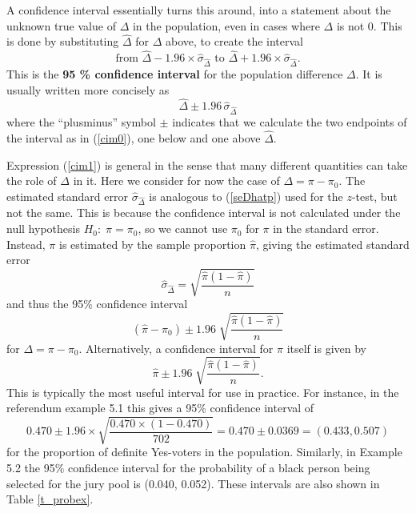 A confidence interval essentially turns this around, into a statement
about the unknown true value of $\Delta$ in the population, even in
cases where $\Delta$ is not 0.
This is done by substituting $\hat{\Delta}$ for $\Delta$
above, to create the interval
\begin{equation}
\text{from  }
\hat{\Delta} -1.96\times \hat{\sigma}_{\hat{\Delta}}
\text{  to  }
\hat{\Delta}
+1.96\times \hat{\sigma}_{\hat{\Delta}}.
\label{cim0}
\end{equation}
This is the \textbf{95 \% confidence interval} for the population
difference $\Delta$. It is
usually written more concisely as
\begin{equation}
\hat{\Delta}
\pm 1.96\, \hat{\sigma}_{\hat{\Delta}}
\label{cim1}
\end{equation}
where the ``plusminus'' symbol $\pm$ indicates that we calculate the two
endpoints of the interval as in (\ref{cim0}), one below and one above
$\hat{\Delta}$.

Expression (\ref{cim1}) is general in the sense that many different
quantities can take the role of $\Delta$ in it. Here we consider for now
the case of $\Delta=\pi-\pi_{0}$. The estimated standard error
$\hat{\sigma}_{\hat{\Delta}}$ is analogous to
(\ref{seDhatp}) used for the $z$-test, but not the same.
This is because the confidence interval
is not calculated under the null hypothesis $H_{0}:\; \pi=\pi_{0}$, so
we cannot use $\pi_{0}$ for $\pi$ in the standard error. Instead, $\pi$
is estimated by the sample proportion $\hat{\pi}$, giving the estimated
standard error
\begin{equation}
\hat{\sigma}_{\hat{\Delta}} = \sqrt{
\frac{\hat{\pi}(1-\hat{\pi})}{n}
}
\label{sephat2}
\end{equation}
and thus the 95\% confidence interval
\[
(\hat{\pi}-\pi_{0}) \pm 1.96 \;
\sqrt{
\frac{\hat{\pi}(1-\hat{\pi})}{n}}
\]
for $\Delta=\pi-\pi_{0}$. Alternatively, a confidence interval for
$\pi$ itself is given by
\begin{equation}
\hat{\pi} \pm 1.96 \;
\sqrt{
\frac{\hat{\pi}(1-\hat{\pi})}{n}}.
\label{cip2}
\end{equation}
This is typically the most useful interval for use in practice.
For instance, in the referendum example 5.1 this
gives a 95\% confidence interval of
\[
0.470\pm 1.96\times \sqrt{\frac{0.470\times(1-0.470)}{702}}
=0.470\pm 0.0369=(0.433, 0.507)
\]
for the proportion of definite Yes-voters in the population. Similarly,
in Example 5.2 the 95\% confidence interval for the probability of a
black person being selected for the jury pool is (0.040, 0.052). These
intervals are also shown in Table \ref{t_probex}.


